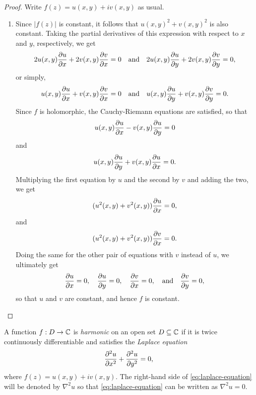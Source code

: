 \begin{proof}
    Write \(f(z) = u(x, y) + iv(x, y)\) as usual.
    \begin{enumerate}[label=(\alph*), wide]
        \item Since \(|f(z)|\) is constant, it follows that \(u(x, y)^2 + v(x, y)^2\) is also constant. Taking the partial derivatives of this expression with respect to \(x\) and \(y\), respectively, we get
        \[
            2u(x, y)\frac{\partial u}{\partial x} + 2v(x, y)\frac{\partial v}{\partial x} = 0 \quad \text{and} \quad 2u(x, y)\frac{\partial u}{\partial y} + 2v(x, y)\frac{\partial v}{\partial y} = 0,
        \]
        or simply,
        \[
            u(x, y)\frac{\partial u}{\partial x} + v(x, y)\frac{\partial v}{\partial x} = 0 \quad \text{and} \quad u(x, y)\frac{\partial u}{\partial y} + v(x, y)\frac{\partial v}{\partial y} = 0.
        \]
        Since \(f\) is holomorphic, the Cauchy-Riemann equations are satisfied, so that
        \[
            u(x, y)\frac{\partial u}{\partial x} - v(x, y)\frac{\partial u}{\partial y} = 0
        \]
        and
        \[
            u(x, y)\frac{\partial u}{\partial y} + v(x, y)\frac{\partial u}{\partial x} = 0.
        \]
        Multiplying the first equation by \(u\) and the second by \(v\) and adding the two, we get
        \[
            (u^2(x, y) + v^2(x, y))\frac{\partial u}{\partial x} = 0,
        \]
        and
        \[
            (u^2(x, y) + v^2(x, y))\frac{\partial v}{\partial x} = 0.
        \]
        Doing the same for the other pair of equations with \(v\) instead of \(u\), we ultimately get
        \[
            \frac{\partial u}{\partial x} = 0, \quad \frac{\partial u}{\partial y} = 0, \quad \frac{\partial v}{\partial x} = 0, \quad \text{and} \quad \frac{\partial v}{\partial y} = 0,
        \]
        so that \(u\) and \(v\) are constant, and hence \(f\) is constant.
    \end{enumerate}
\end{proof}

\begin{definition}
    A function \(f: D \to \mathbb{C}\) is \emph{harmonic} on an open set \(D \subseteq \mathbb{C}\) if it is twice continuously differentiable and satisfies the \emph{Laplace equation}
    \begin{equation}
        \frac{\partial ^2u}{\partial x^2} + \frac{\partial ^2u}{\partial y^2} = 0,
        \label{eq:laplace-equation}
    \end{equation}
    where \(f(z) = u(x, y) + iv(x, y)\). The right-hand side of \eqref{eq:laplace-equation} will be denoted by \(\nabla^2 u\) so that \eqref{eq:laplace-equation} can be written as \(\nabla^2 u = 0\).
    \label{def:harmonic-function}
\end{definition}


